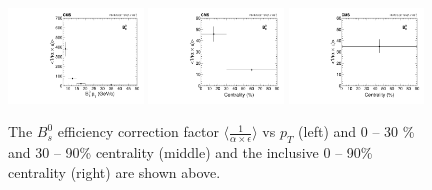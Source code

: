 \begin{figure}[h]
\begin{center}
\includegraphics[width= 0.32\textwidth]{Figures/Chapter4/EffPlotPt.pdf}
\includegraphics[width= 0.32\textwidth]{Figures/Chapter4/EffPlotCent.pdf}
\includegraphics[width= 0.32\textwidth]{Figures/Chapter4/EffPlotCentInc.pdf}
\caption{The $B^0_s$ efficiency correction factor $\langle\frac{1}{\alpha \times \epsilon} \rangle$ vs $p_T$ (left) and 0 -- 30 \% and 30 -- 90\% centrality (middle) and the inclusive 0 -- 90\% centrality (right) are shown above.}
\label{BsEffFig}
\end{center}
\end{figure}

